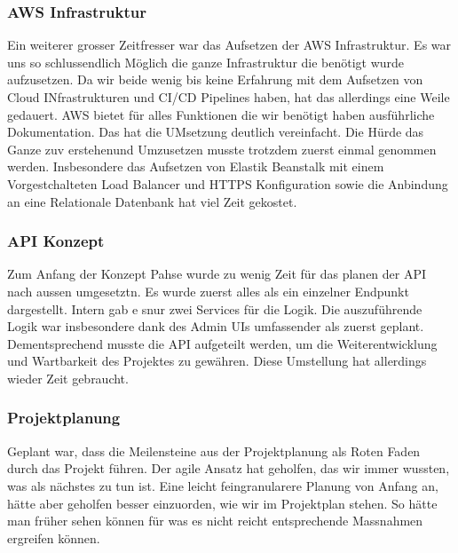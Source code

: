 \subsubsection*{AWS Infrastruktur}

Ein weiterer grosser Zeitfresser war das Aufsetzen der AWS Infrastruktur.
Es war uns so schlussendlich Möglich die ganze Infrastruktur die benötigt wurde aufzusetzen.
Da wir beide wenig bis keine Erfahrung mit dem Aufsetzen von Cloud INfrastrukturen und CI/CD Pipelines haben, hat das allerdings eine Weile gedauert.
AWS bietet für alles Funktionen die wir benötigt haben ausführliche Dokumentation.
Das hat die UMsetzung deutlich vereinfacht.
Die Hürde das Ganze zuv erstehenund Umzusetzen musste trotzdem zuerst einmal genommen werden.
Insbesondere das Aufsetzen von Elastik Beanstalk mit einem Vorgestchalteten Load Balancer und HTTPS Konfiguration sowie die Anbindung an eine Relationale Datenbank hat viel Zeit gekostet.

\subsubsection*{API Konzept}

Zum Anfang der Konzept Pahse wurde zu wenig Zeit für das planen der API nach aussen umgesetztn.
Es wurde zuerst alles als ein einzelner Endpunkt dargestellt.
Intern gab e snur zwei Services für die Logik.
Die auszuführende Logik war insbesondere dank des Admin UIs umfassender als zuerst geplant.
Dementsprechend musste die API aufgeteilt werden, um die Weiterentwicklung und Wartbarkeit des Projektes zu gewähren.
Diese Umstellung hat allerdings wieder Zeit gebraucht.


\subsubsection*{Projektplanung}

Geplant war, dass die Meilensteine aus der Projektplanung als Roten Faden durch das Projekt führen.
Der agile Ansatz hat geholfen, das wir immer wussten, was als nächstes zu tun ist.
Eine leicht feingranularere Planung von Anfang an, hätte aber geholfen besser einzuorden, wie wir im Projektplan stehen.
So hätte man früher sehen können für was es nicht reicht entsprechende Massnahmen ergreifen können.

